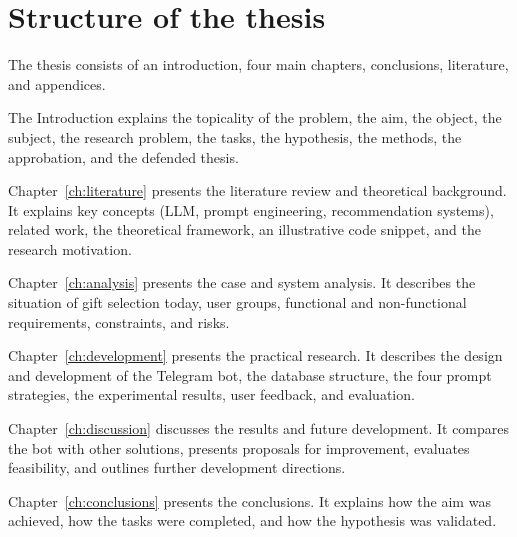 \section*{Structure of the thesis}

The thesis consists of an introduction, four main chapters, conclusions, literature, and appendices.

The Introduction explains the topicality of the problem, the aim, the object, the subject, the research problem, the tasks, the hypothesis, the methods, the approbation, and the defended thesis.

Chapter~\ref{ch:literature} presents the literature review and theoretical background. It explains key concepts (LLM, prompt engineering, recommendation systems), related work, the theoretical framework, an illustrative code snippet, and the research motivation.

Chapter~\ref{ch:analysis} presents the case and system analysis. It describes the situation of gift selection today, user groups, functional and non-functional requirements, constraints, and risks.

Chapter~\ref{ch:development} presents the practical research. It describes the design and development of the Telegram bot, the database structure, the four prompt strategies, the experimental results, user feedback, and evaluation.

Chapter~\ref{ch:discussion} discusses the results and future development. It compares the bot with other solutions, presents proposals for improvement, evaluates feasibility, and outlines further development directions.

Chapter~\ref{ch:conclusions} presents the conclusions. It explains how the aim was achieved, how the tasks were completed, and how the hypothesis was validated.
